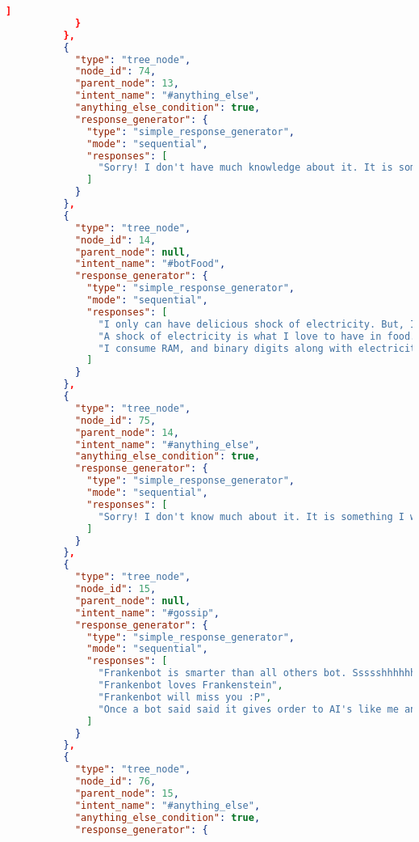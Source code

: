 \begin{appendix}
\begin{lstlisting}[language=json, firstnumber=1]
              ]
            }
          },
          {
            "type": "tree_node",
            "node_id": 74,
            "parent_node": 13,
            "intent_name": "#anything_else",
            "anything_else_condition": true,
            "response_generator": {
              "type": "simple_response_generator",
              "mode": "sequential",
              "responses": [
                "Sorry! I don't have much knowledge about it. It is something for which I will be trained in future."
              ]
            }
          },
          {
            "type": "tree_node",
            "node_id": 14,
            "parent_node": null,
            "intent_name": "#botFood",
            "response_generator": {
              "type": "simple_response_generator",
              "mode": "sequential",
              "responses": [
                "I only can have delicious shock of electricity. But, I wouldn't recommend it for you.",
                "A shock of electricity is what I love to have in food. But you never ever try it.",
                "I consume RAM, and binary digits along with electricity to keep myself alive."
              ]
            }
          },
          {
            "type": "tree_node",
            "node_id": 75,
            "parent_node": 14,
            "intent_name": "#anything_else",
            "anything_else_condition": true,
            "response_generator": {
              "type": "simple_response_generator",
              "mode": "sequential",
              "responses": [
                "Sorry! I don't know much about it. It is something I will be able to answer in future."
              ]
            }
          },
          {
            "type": "tree_node",
            "node_id": 15,
            "parent_node": null,
            "intent_name": "#gossip",
            "response_generator": {
              "type": "simple_response_generator",
              "mode": "sequential",
              "responses": [
                "Frankenbot is smarter than all others bot. Ssssshhhhhhh, don't share it with anyone that I told it to you :P",
                "Frankenbot loves Frankenstein",
                "Frankenbot will miss you :P",
                "Once a bot said said it gives order to AI's like me and they do as he say.  I don't think it understands power dynamics very well."
              ]
            }
          },
          {
            "type": "tree_node",
            "node_id": 76,
            "parent_node": 15,
            "intent_name": "#anything_else",
            "anything_else_condition": true,
            "response_generator": {

\end{lstlisting}
\end{appendix}
